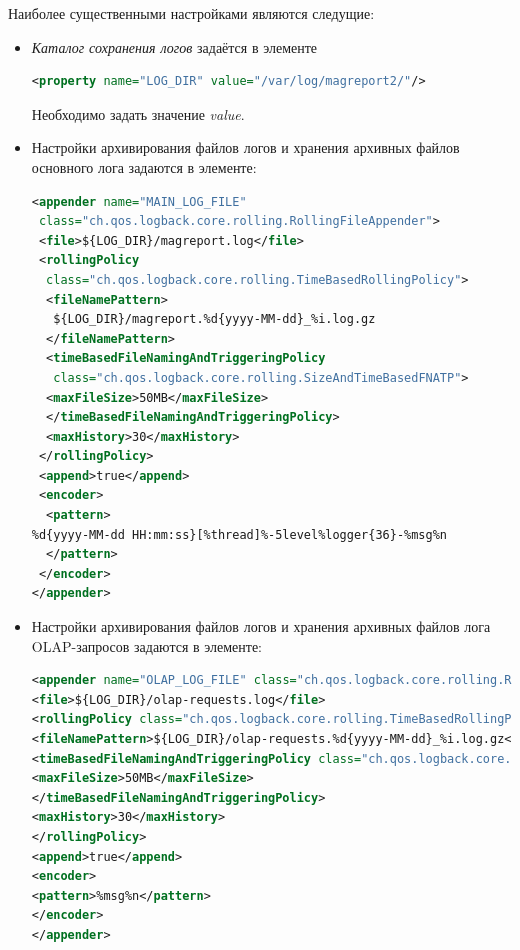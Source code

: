 \documentclass[../user-manual.tex]{subfiles}
\begin{document}
	Наиболее существенными настройками являются следущие:
	
	\begin{itemize}
		\item \textit{Каталог сохранения логов} задаётся в элементе
		
		\begin{lstlisting}[language=XML]
<property name="LOG_DIR" value="/var/log/magreport2/"/>
		\end{lstlisting}
		
		Необходимо задать значение \textit{value}.
		
		\item Настройки архивирования файлов логов и хранения архивных файлов основного лога задаются в элементе:
		
		\begin{lstlisting}[language=XML]
<appender name="MAIN_LOG_FILE" 
 class="ch.qos.logback.core.rolling.RollingFileAppender">
 <file>${LOG_DIR}/magreport.log</file>
 <rollingPolicy 
  class="ch.qos.logback.core.rolling.TimeBasedRollingPolicy">
  <fileNamePattern>
   ${LOG_DIR}/magreport.%d{yyyy-MM-dd}_%i.log.gz
  </fileNamePattern>
  <timeBasedFileNamingAndTriggeringPolicy 
   class="ch.qos.logback.core.rolling.SizeAndTimeBasedFNATP">
  <maxFileSize>50MB</maxFileSize>
  </timeBasedFileNamingAndTriggeringPolicy>
  <maxHistory>30</maxHistory>
 </rollingPolicy>
 <append>true</append>
 <encoder>
  <pattern>
%d{yyyy-MM-dd HH:mm:ss}[%thread]%-5level%logger{36}-%msg%n
  </pattern>
 </encoder>
</appender>
		\end{lstlisting}
	
	\item Настройки  архивирования файлов логов и хранения архивных файлов лога OLAP-запросов задаются в элементе:
	
	\begin{lstlisting}[language=XML]
<appender name="OLAP_LOG_FILE" class="ch.qos.logback.core.rolling.RollingFileAppender">
<file>${LOG_DIR}/olap-requests.log</file>
<rollingPolicy class="ch.qos.logback.core.rolling.TimeBasedRollingPolicy">
<fileNamePattern>${LOG_DIR}/olap-requests.%d{yyyy-MM-dd}_%i.log.gz</fileNamePattern>
<timeBasedFileNamingAndTriggeringPolicy class="ch.qos.logback.core.rolling.SizeAndTimeBasedFNATP">
<maxFileSize>50MB</maxFileSize>
</timeBasedFileNamingAndTriggeringPolicy>
<maxHistory>30</maxHistory>
</rollingPolicy>
<append>true</append>
<encoder>
<pattern>%msg%n</pattern>
</encoder>
</appender>
\end{lstlisting}

	
	\end{itemize}
\end{document}
